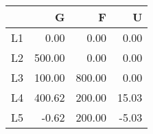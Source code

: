 \begin{table}[ht]
\centering
\begin{tabular}{rrrr}
  \hline
 & G & F & U \\ 
  \hline
L1 & 0.00 & 0.00 & 0.00 \\ 
  L2 & 500.00 & 0.00 & 0.00 \\ 
  L3 & 100.00 & 800.00 & 0.00 \\ 
  L4 & 400.62 & 200.00 & 15.03 \\ 
  L5 & -0.62 & 200.00 & -5.03 \\ 
   \hline
\end{tabular}
\end{table}
